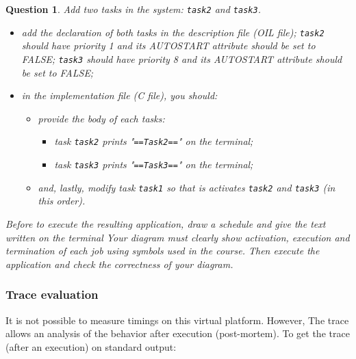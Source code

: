 \documentclass[11pt]{report}
\newcommand{\namedtodo}[2][]{%
  {%
    \todo[color={yellow!50},size=\small]{%
      \textbf{TODO [\uppercase{#1}]:}~#2}%
  }}
\newtheorem{ex}{Question}
\begin{document}
\begin{ex}
  Add two tasks in the system: \texttt{task2} and \texttt{task3}.
  \begin{itemize}
    \item add the declaration of both tasks in the description file (OIL file); \texttt{task2} should have priority 1 and its AUTOSTART attribute should be set to FALSE; \texttt{task3} should have priority 8 and its AUTOSTART attribute should be set to FALSE;
    \item in the implementation file (C file), you should:
      \begin{itemize}
        \item provide the body of each tasks:
          \begin{itemize}
            \item task \texttt{task2} prints "\texttt{==Task2==}" on the terminal;
            \item task \texttt{task3} prints "\texttt{==Task3==}" on the terminal;
          \end{itemize}
        \item and, lastly, modify task \texttt{task1} so that is activates \texttt{task2} and \texttt{task3} (in this order).
      \end{itemize}
  \end{itemize}

  Before to execute the resulting application, draw a schedule and give the text written on the terminal
  Your diagram must clearly show activation, execution and termination of each job using symbols used in the course.
  Then execute the application and check the correctness of your diagram.
\end{ex}

%


\subsubsection{Trace evaluation}
%
It is not possible to measure timings on this virtual platform. However, The trace allows an analysis of the behavior after execution (post-mortem). To get the trace (after an execution) on standard output:
\end{document}
